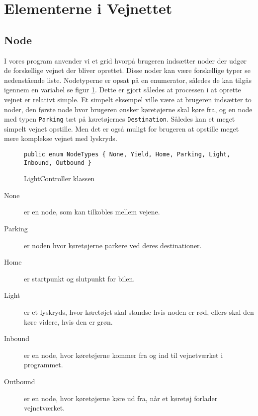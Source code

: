 \section{Elementerne i Vejnettet}\label{ElementerVejnettet}
\subsection{Node}
I vores program anvender vi et grid hvorpå brugeren indsætter noder der udgør de forskellige vejnet der bliver oprettet. Disse noder kan være forskellige typer se nedenstående liste. Nodetyperne er opsat på en enumerator, således de kan tilgås igennem en variabel se figur \ref{enumNodeTypes}. Dette er gjort således at processen i at oprette vejnet er relativt simple. Et simpelt eksempel ville være at brugeren indsætter to noder, den første node hvor brugeren ønsker køretøjerne skal køre fra, og en node med typen \texttt{Parking} tæt på køretøjernes \texttt{Destination}. Således kan et meget simpelt vejnet opstille. Men det er også muligt for brugeren at opstille meget mere komplekse vejnet med lyskryds.

\begin{figure}[H]
\begin{lstlisting}
public enum NodeTypes { None, Yield, Home, Parking, Light, Inbound, Outbound }
\end{lstlisting}
\caption{LightController klassen}\label{enumNodeTypes}
\end{figure}

\begin{description}
\item [None] er en node, som kan tilkobles mellem vejene.
\item [Parking] er noden hvor køretøjerne parkere ved deres destinationer.
\item [Home] er startpunkt og slutpunkt for bilen.
\item [Light] er et lyskryds, hvor køretøjet skal standse hvis noden er rød, ellers skal den køre videre, hvis den er grøn.
\item [Inbound] er en node, hvor køretøjerne kommer fra og ind til vejnetværket i programmet.
\item [Outbound] er en node, hvor køretøjerne køre ud fra, når et køretøj forlader vejnetværket.
\end{description}

